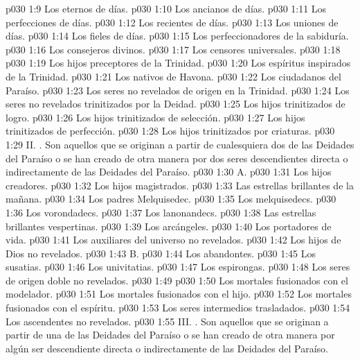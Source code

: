 \vs p030 1:9 Los eternos de días.
\vs p030 1:10 Los ancianos de días.
\vs p030 1:11 Los perfecciones de días.
\vs p030 1:12 Los recientes de días.
\vs p030 1:13 Los uniones de días.
\vs p030 1:14 Los fieles de días.
\vs p030 1:15 Los perfeccionadores de la sabiduría.
\vs p030 1:16 Los consejeros divinos.
\vs p030 1:17 Los censores universales.
\vs p030 1:18 \pc {}
\vs p030 1:19 Los hijos preceptores de la Trinidad.
\vs p030 1:20 Los espíritus inspirados de la Trinidad.
\vs p030 1:21 Los nativos de Havona.
\vs p030 1:22 Los ciudadanos del Paraíso.
\vs p030 1:23 Los seres no revelados de origen en la Trinidad.
\vs p030 1:24 Los seres no revelados trinitizados por la Deidad.
\vs p030 1:25 Los hijos trinitizados de logro.
\vs p030 1:26 Los hijos trinitizados de selección.
\vs p030 1:27 Los hijos trinitizados de perfección.
\vs p030 1:28 Los hijos trinitizados por criaturas.
\vs p030 1:29 \pc II. . Son aquellos que se originan a partir de cualesquiera dos de las Deidades del Paraíso o se han creado de otra manera por dos seres descendientes directa o indirectamente de las Deidades del Paraíso.
\vs p030 1:30 \pc A. 
\vs p030 1:31 Los hijos creadores.
\vs p030 1:32 Los hijos magistrados.
\vs p030 1:33 Las estrellas brillantes de la mañana.
\vs p030 1:34 Los padres Melquisedec.
\vs p030 1:35 Los melquisedecs.
\vs p030 1:36 Los vorondadecs.
\vs p030 1:37 Los lanonandecs.
\vs p030 1:38 Las estrellas brillantes vespertinas.
\vs p030 1:39 Los arcángeles.
\vs p030 1:40 Los portadores de vida.
\vs p030 1:41 Los auxiliares del universo no revelados.
\vs p030 1:42 Los hijos de Dios no revelados.
\vs p030 1:43 \pc B. 
\vs p030 1:44 Los abandontes.
\vs p030 1:45 Los susatias.
\vs p030 1:46 Los univitatias.
\vs p030 1:47 Los espirongas.
\vs p030 1:48 Los seres de origen doble no revelados.
\vs p030 1:49 \pc {}
\vs p030 1:50 Los mortales fusionados con el modelador.
\vs p030 1:51 Los mortales fusionados con el hijo.
\vs p030 1:52 Los mortales fusionados con el espíritu.
\vs p030 1:53 Los seres intermedios trasladados.
\vs p030 1:54 Los ascendentes no revelados.
\vs p030 1:55 \pc III. . Son aquellos que se originan a partir de una de las Deidades del Paraíso o se han creado de otra manera por algún ser descendiente directa o indirectamente de las Deidades del Paraíso.
